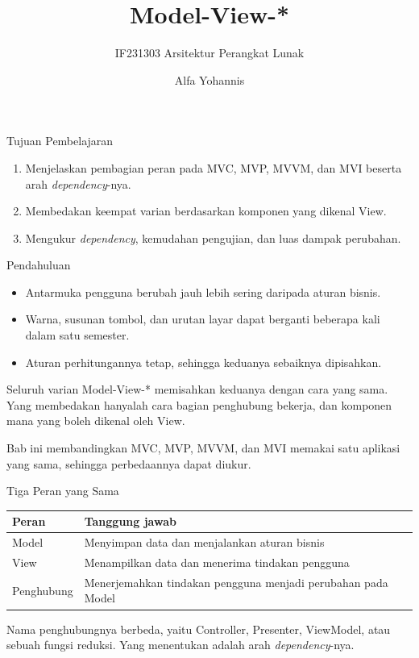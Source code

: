 \documentclass[aspectratio=169, table, 12pt]{beamer}
\title{\Huge{Model-View-*}}
\subtitle{IF231303 Arsitektur Perangkat Lunak}
\author{Alfa Yohannis}
\begin{document}
\frame{\titlepage}

\begin{frame}{{\Large Tujuan Pembelajaran}}
  \vspace{10pt}
  \begin{enumerate}
    \item Menjelaskan pembagian peran pada MVC, MVP, MVVM, dan MVI beserta arah
          \textit{dependency}-nya.
    \item Membedakan keempat varian berdasarkan komponen yang dikenal View.
    \item Mengukur \textit{dependency}, kemudahan pengujian, dan luas dampak
          perubahan.
  \end{enumerate}
\end{frame}

\begin{frame}{{\Large Pendahuluan}}
  \vspace{8pt}
  \begin{itemize}
    \item Antarmuka pengguna berubah jauh lebih sering daripada aturan bisnis.
    \item Warna, susunan tombol, dan urutan layar dapat berganti beberapa kali
          dalam satu semester.
    \item Aturan perhitungannya tetap, sehingga keduanya sebaiknya dipisahkan.
  \end{itemize}

  \vspace{8pt}
  {\small Seluruh varian Model-View-* memisahkan keduanya dengan cara yang sama.
  Yang membedakan hanyalah cara bagian penghubung bekerja, dan komponen mana
  yang boleh dikenal oleh View.}

  \vspace{6pt}
  {\small Bab ini membandingkan MVC, MVP, MVVM, dan MVI memakai satu aplikasi
  yang sama, sehingga perbedaannya dapat diukur.}
\end{frame}

\begin{frame}{{\Large Tiga Peran yang Sama}}
  \vspace{8pt}
  \centering
  \begin{tabularx}{0.9\textwidth}{|l|X|}
    \hline
    \textbf{Peran} & \textbf{Tanggung jawab} \\
    \hline
    Model & Menyimpan data dan menjalankan aturan bisnis \\
    \hline
    View & Menampilkan data dan menerima tindakan pengguna \\
    \hline
    Penghubung & Menerjemahkan tindakan pengguna menjadi perubahan pada Model \\
    \hline
  \end{tabularx}

  \vspace{10pt}
  {\small Nama penghubungnya berbeda, yaitu Controller, Presenter, ViewModel,
  atau sebuah fungsi reduksi. Yang menentukan adalah arah \textit{dependency}-nya.}
\end{frame}
\end{document}
